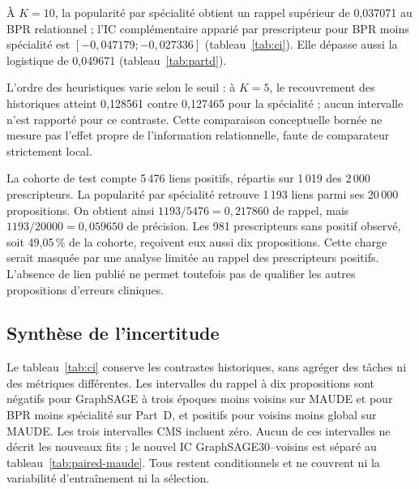 \begin{table}[!htbp]
\centering\small
\caption{Part D, test 2024, identité générique exacte. Les rappels sont à $K=10$. Rappel et MRR concernent les 1\,019 prescripteurs avec positifs ; P@10 utilise les 2\,000 prescripteurs admissibles. Le BPR macro/MRR est repris à six décimales du rapport. Sources : résumé et exécution compacte\cite{hgbresults,hgbpartd}.}
\label{tab:partd}

\end{table}

À $K=10$, la popularité par spécialité obtient un rappel supérieur de 0,037071 au BPR relationnel ; l'IC complémentaire apparié par prescripteur pour BPR moins spécialité est $[-0,047179;-0,027336]$ (tableau~\ref{tab:ci}). Elle dépasse aussi la logistique de 0,049671 (tableau~\ref{tab:partd}).

L'ordre des heuristiques varie selon le seuil : à $K=5$, le recouvrement des historiques atteint 0,128561 contre 0,127465 pour la spécialité ; aucun intervalle n'est rapporté pour ce contraste. Cette comparaison conceptuelle bornée ne mesure pas l'effet propre de l'information relationnelle, faute de comparateur strictement local.

La cohorte de test compte 5\,476 liens positifs, répartis sur 1\,019 des 2\,000 prescripteurs. La popularité par spécialité retrouve 1\,193 liens parmi ses 20\,000 propositions. On obtient ainsi $1193/5476=0,217860$ de rappel, mais $1193/20000=0,059650$ de précision. Les 981 prescripteurs sans positif observé, soit 49,05\,\% de la cohorte, reçoivent eux aussi dix propositions\cite{hgbpartd}. Cette charge serait masquée par une analyse limitée au rappel des prescripteurs positifs. L'absence de lien publié ne permet toutefois pas de qualifier les autres propositions d'erreurs cliniques.

\subsection{Synthèse de l'incertitude}

Le tableau~\ref{tab:ci} conserve les contrastes historiques, sans agréger des tâches ni des métriques différentes. Les intervalles du rappel à dix propositions sont négatifs pour GraphSAGE à trois époques moins voisins sur MAUDE et pour BPR moins spécialité sur Part~D, et positifs pour voisins moins global sur MAUDE. Les trois intervalles CMS incluent zéro. Aucun de ces intervalles ne décrit les nouveaux fits ; le nouvel IC GraphSAGE30--voisins est séparé au tableau~\ref{tab:paired-maude}. Tous restent conditionnels et ne couvrent ni la variabilité d'entraînement ni la sélection.


